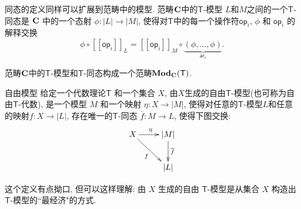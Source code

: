 \documentclass{beamer}
\newcommand{\theory}[1]{\mathsf{#1}} %
\newcommand{\ModC}[2]{\text{\textbf{Mod}}_{#1}(\theory{#2})} %
\newcommand{\category}[1]{\text{\textbf{#1}}} %
\newcommand{\carrier}[1]{|#1|} %
\newcommand{\op}[1]{\mathsf{op}_{#1}} %
\newcommand{\arity}[1]{\mathsf{ar}_{#1}} %
\newcommand{\sem}[1]{[\![#1]\!]} %
\begin{document}
\begin{frame}
同态的定义同样可以扩展到范畴中的模型. 范畴$\category{C}$中的$\theory{T}$-模型 $L$和$M$之间的一个$\theory{T}$-同态是 $\category{C}$ 中的一个态射 $\phi : \carrier{L} \to \carrier{M}$, 使得对$\theory{T}$中的每一个操作符$\op{i}$, $\phi$ 和 $\op{i}$ 的解释交换
\begin{equation*}
  ϕ ∘ \sem{\op{i}}_L = \sem{\op{i}}_M ∘  \underbrace{(\phi, …, \phi)}_{\arity{i}}.
\end{equation*}

范畴$\category{C}$中的$\theory{T}$-模型和$\theory{T}$-同态构成一个范畴$\ModC{\category{C}}{T}$.
\end{frame}

\begin{frame}{自由模型}
给定一个代数理论$\theory{T}$ 和一个集合 $X$, 由$X$生成的自由$\theory{T}$-模型(也可称为自由$\theory{T}$-代数), 是一个模型 $M$ 和一个映射 $\eta : X \to \carrier{M}$, 使得对任意的$\theory{T}$-模型$L$和任意的映射$f:X\to\carrier{L}$, 存在唯一的$\theory{T}$-同态 $\overline{f} : M \to L$, 使得下图交换:
\begin{equation*}
  \xymatrix{
    {X}
    \ar[r]^{\eta}
    \ar[rd]_{f}
    &
    {\carrier{M}}
    \ar[d]^{\overline{f}}
    \\
    &
     \carrier{L}
  }
\end{equation*}

这个定义有点拗口, 但可以这样理解: 由 $X$ 生成的自由 $\theory{T}$-模型是从集合 $X$ 构造出 $\theory{T}$-模型的``最经济"的方式.
\end{frame}
\end{document}
